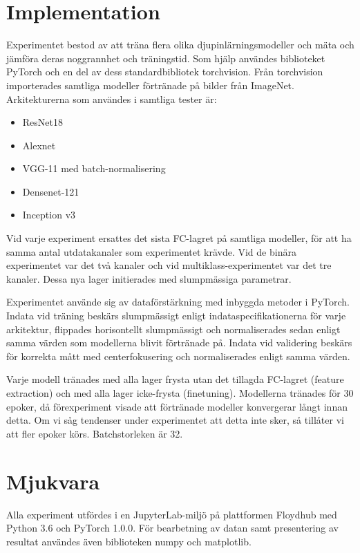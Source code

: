 \documentclass[]{kththesis}
\begin{document}
\section{Implementation}
Experimentet bestod av att träna flera olika djupinlärningsmodeller och mäta och jämföra deras noggrannhet och träningstid. Som hjälp användes biblioteket PyTorch \parencite{paszke2017automatic} och en del av dess standardbibliotek torchvision. Från torchvision importerades samtliga modeller förtränade på bilder från ImageNet. Arkitekturerna som användes i samtliga tester är:
\begin{itemize}
  \item ResNet18
  \item Alexnet
  \item VGG-11 med batch-normalisering
  \item Densenet-121
  \item Inception v3
\end{itemize}

Vid varje experiment ersattes det sista FC-lagret på samtliga modeller, för att ha samma antal utdatakanaler som experimentet krävde. Vid de binära experimentet var det två kanaler och vid multiklass-experimentet var det tre kanaler. Dessa nya lager initierades med slumpmässiga parametrar.

Experimentet använde sig av dataförstärkning med inbyggda metoder i PyTorch. Indata vid träning beskärs slumpmässigt enligt indataspecifikationerna för varje arkitektur, flippades horisontellt slumpmässigt och normaliserades sedan enligt samma värden som modellerna blivit förtränade på. Indata vid validering beskärs för korrekta mått med centerfokusering och normaliserades enligt samma värden.

Varje modell tränades med alla lager frysta utan det tillagda FC-lagret (feature extraction) och med alla lager icke-frysta (finetuning). Modellerna tränades för 30 epoker, då förexperiment visade att förtränade modeller konvergerar långt innan detta. Om vi såg tendenser under experimentet att detta inte sker, så tillåter vi att fler epoker körs. Batchstorleken är 32.

\section{Mjukvara}
Alla experiment utfördes i en JupyterLab-miljö på plattformen Floydhub \parencite{floydhub} med Python 3.6 och PyTorch 1.0.0. För bearbetning av datan samt presentering av resultat användes även biblioteken numpy och matplotlib.
\end{document}
